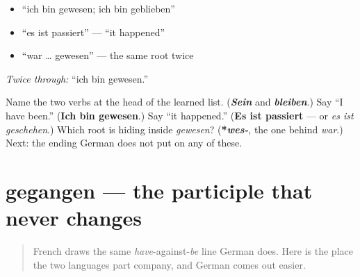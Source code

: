 \begin{itemize}
\raggedright
  \item \textquotedblleft{}ich bin gewesen; ich bin geblieben\textquotedblright{}
  \item \textquotedblleft{}es ist passiert\textquotedblright{} — \textquotedblleft{}it happened\textquotedblright{}
  \item \textquotedblleft{}war … gewesen\textquotedblright{} — the same root twice
\end{itemize}

\emph{Twice through:} \textquotedblleft{}ich bin gewesen.\textquotedblright{}

\begin{tcolorbox}[breakable,colback=teal!4,colframe=teal!35!black,title={Before you move on}]
Name the two verbs at the head of the learned list. (\emph{\textbf{Sein}} and \emph{\textbf{bleiben}}.) Say \textquotedblleft{}I have been.\textquotedblright{} (\textbf{Ich bin gewesen}.) Say \textquotedblleft{}it happened.\textquotedblright{} (\textbf{Es ist passiert} — or \emph{es ist geschehen}.) Which root is hiding inside \emph{gewesen}? (\textbf{*\emph{wes-}}, the one behind \emph{war}.) Next: the ending German does not put on any of these.
\end{tcolorbox}
\section[gegangen]{gegangen — the participle that never changes}

\label{lesson:GE-C16-perfekt-sein-agreement}



\begin{quote}
French draws the same \emph{have}-against-\emph{be} line German does. Here is the place the two languages part company, and German comes out easier.
\end{quote}

